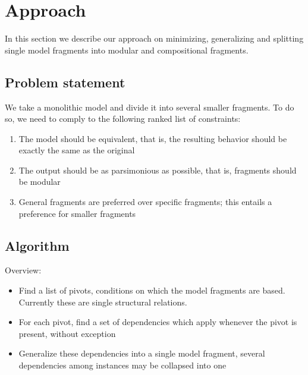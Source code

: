 \documentclass{article}
\begin{document}
\section{Approach}
In this section we describe our approach on minimizing, generalizing and
splitting single model fragments into modular and compositional fragments.

\subsection{Problem statement}

We take a monolithic model and divide it into several smaller fragments. To do
so, we need to comply to the following ranked list of constraints:

\begin{enumerate}
\item The model should be equivalent, that is, the resulting behavior should be
	exactly the same as the original

\item The output should be as parsimonious as possible, that is, fragments
	should be modular

\item General fragments are preferred over specific fragments; this entails a
	preference for smaller fragments

\end{enumerate}

\subsection{Algorithm}

Overview:

\begin{itemize}

\item Find a list of pivots, conditions on which the model fragments are based.
	Currently these are single structural relations.

\item For each pivot, find a set of dependencies which apply whenever the pivot
	is present, without exception

\item Generalize these dependencies into a single model fragment, several
	dependencies among instances may be collapsed into one

\end{itemize}

%
%
\end{document}
